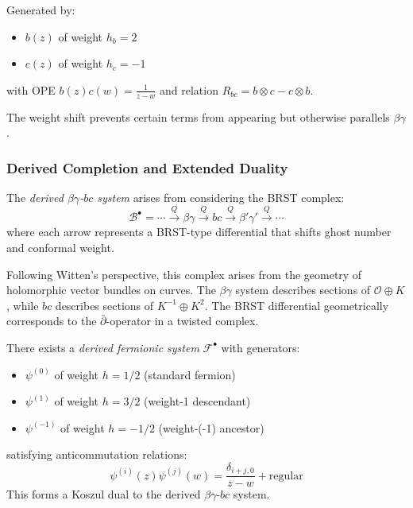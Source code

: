 \begin{definition}
Generated by:
\begin{itemize}
\item $b(z)$ of weight $h_b = 2$
\item $c(z)$ of weight $h_c = -1$
\end{itemize}
with OPE $b(z)c(w) = \frac{1}{z-w}$ and relation $R_{bc} = b \otimes c - c \otimes b$.
\end{definition}
 
The weight shift prevents certain terms from appearing but otherwise parallels $\beta\gamma$.
 
\subsubsection{Derived Completion and Extended Duality}

\begin{definition}\label{def:derived-bg-bc}
The \emph{derived $\beta\gamma$-$bc$ system} arises from considering the BRST complex:
\[
\mathcal{B}^{\bullet} = \cdots \xrightarrow{Q} \beta\gamma \xrightarrow{Q} bc \xrightarrow{Q} \beta'\gamma' \xrightarrow{Q} \cdots
\]
where each arrow represents a BRST-type differential that shifts ghost number and conformal weight.
\end{definition}

\begin{remark}
Following Witten's perspective, this complex arises from the geometry of holomorphic vector bundles 
on curves. The $\beta\gamma$ system describes sections of $\mathcal{O} \oplus K$, while $bc$ describes 
sections of $K^{-1} \oplus K^2$. The BRST differential geometrically corresponds to the 
$\bar{\partial}$-operator in a twisted complex.
\end{remark}

\begin{theorem}\label{thm:extended-ferm-ghost}
There exists a \emph{derived fermionic system} $\mathcal{F}^{\bullet}$ with generators:
\begin{itemize}
\item $\psi^{(0)}$ of weight $h = 1/2$ (standard fermion)
\item $\psi^{(1)}$ of weight $h = 3/2$ (weight-1 descendant)
\item $\psi^{(-1)}$ of weight $h = -1/2$ (weight-(-1) ancestor)
\end{itemize}
satisfying anticommutation relations:
\[
\psi^{(i)}(z)\psi^{(j)}(w) = \frac{\delta_{i+j,0}}{z-w} + \text{regular}
\]
This forms a Koszul dual to the derived $\beta\gamma$-$bc$ system.
\end{theorem}


